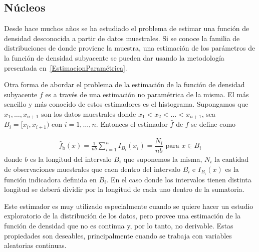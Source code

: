 \subsection{Núcleos}
Desde hace muchos años se ha estudiado el problema de estimar una función de densidad desconocida a partir de datos muestrales. Si se conoce la familia de distribuciones de donde proviene la muestra, una estimación de los parámetros de la función de densidad subyacente se pueden dar usando la metodología presentada en~\ref{EstimacionParamétrica}. 

Otra forma de abordar el problema de la estimación de la función de densidad subyacente $f$ es a través de una estimación no paramétrica de la misma. El más sencillo y más conocido de estos estimadores es el histograma. Supongamos que $x_1,\ldots,x_{n+1}$ son los datos muestrales donde $x_1<x_2<\ldots<x_{n+1}$, sea $B_i=[x_i,x_{i+1}) \text{ con } i=1,\ldots,n.$ Entonces el estimador $\widehat{f}$ de $f$ se define como 

\begin{align}
\widehat{f}_\text{b}(x)=\frac{1}{n b} \sum_{i=1}^n I_{B_i} (x_i)=\dfrac{N_i}{n b} \text{ para } x \in B_i
\end{align}
donde $b$ es la longitud del intervalo $B_i$ que suponemos la misma, $N_i$ la cantidad de observaciones muestrales que caen dentro del intervalo $B_i$ e $I_{B_i}(x)$ es la función indicadora definida en $B_i$. En el caso donde los intervalos tienen distinta longitud se deberá dividir por la longitud de cada uno dentro de la sumatoria.

Este estimador es muy utilizado especialmente cuando se quiere hacer un estudio exploratorio de la distribución de los datos, pero provee una estimación de la función de densidad que no es continua y, por lo tanto, no derivable. Estas propiedades son deseables, principalmente cuando se trabaja con variables aleatorias continuas.

